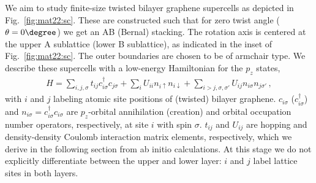 We aim to study finite-size twisted bilayer graphene supercells as depicted in Fig.~\ref{fig:mat22:sc}. These are constructed such that for zero twist angle ($\theta=0\degree$) we get an AB (Bernal) stacking. The rotation axis is centered at the upper A sublattice (lower B sublattice), as indicated in the inset of Fig.~\ref{fig:mat22:sc}. The outer boundaries are chosen to be of armchair type. We describe these supercells with a low-energy Hamiltonian for the $p_z$ states,
\begin{align}\label{eq:mat22:hamiltonian}
    H = \sum_{i,j,\sigma} t_{ij} c_{i\sigma}^\dagger c_{j\sigma}
      + \sum_{i} U_{ii} n_{i\uparrow} n_{i\downarrow}
      + \sum_{i>j,\sigma, \sigma'} U_{ij} n_{i\sigma} n_{j\sigma'}\,,
\end{align}
with $i$ and $j$ labeling atomic site positions of (twisted) bilayer graphene. $c_{i\sigma}$ ($c_{i\sigma}^\dagger$) and $n_{i\sigma} = c_{i\sigma}^\dagger c_{i\sigma}$ are $p_z$-orbital annihilation (creation) and orbital occupation number operators, respectively, at site $i$ with spin $\sigma$. $t_{ij}$ and $U_{ij}$ are hopping and density-density Coulomb interaction matrix elements, respectively, which we derive in the following section from ab initio calculations. At this stage we do not explicitly differentiate between the upper and lower layer: $i$ and $j$ label lattice sites in both layers. 


